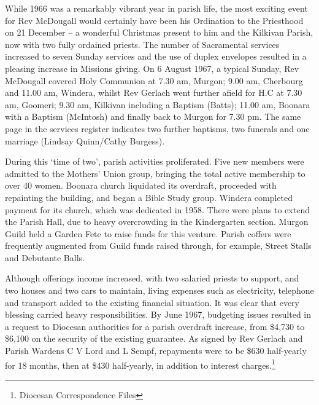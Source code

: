 While 1966 was a remarkably vibrant year in parish life, the most exciting event for Rev McDougall would certainly have been his Ordination to the Priesthood on 21 December -- a wonderful Christmas present to him and the Kilkivan Parish, now with two fully ordained priests. The number of Sacramental services increased to seven Sunday services and the use of duplex envelopes resulted in a pleasing increase in Missions giving. On 6 August 1967, a typical Sunday, Rev McDougall covered Holy Communion at 7.30 am, Murgon; 9.00 am, Cherbourg and 11.00 am, Windera, whilst Rev Gerlach went further afield for H.C at 7.30 am, Goomeri; 9.30 am, Kilkivan including a Baptism (Batts); 11.00 am, Boonara with a Baptism (McIntosh) and finally back to Murgon for 7.30 pm. The same page in the services register indicates two further baptisms, two funerals and one marriage (Lindsay Quinn/Cathy Burgess).



During this `time of two', parish activities proliferated. Five new members were admitted to the Mothers' Union group, bringing the total active membership to over 40 women. Boonara church liquidated its overdraft, proceeded with repainting the building, and began a Bible Study group. Windera completed payment for its church, which was dedicated in 1958. There were plans to extend the Parish Hall, due to heavy overcrowding in the Kindergarten section. Murgon Guild held a Garden Fete to raise funds for this venture. Parish coffers were frequently augmented from Guild funds raised through, for example, Street Stalls and Debutante Balls.



Although offerings income increased, with two salaried priests to support, and two houses and two cars to maintain, living expenses such as electricity, telephone and transport added to the existing financial situation. It was clear that every blessing carried heavy responsibilities. By June 1967, budgeting issues resulted in a request to Diocesan authorities for a parish overdraft increase, from \$4,730 to \$6,100 on the security of the existing guarantee. As signed by Rev Gerlach and Parish Wardens C V Lord and L Sempf, repayments were to be \$630 half-yearly for 18 months, then at \$430 half-yearly, in addition to interest charges.\footnote{Diocesan Correspondence Files}


